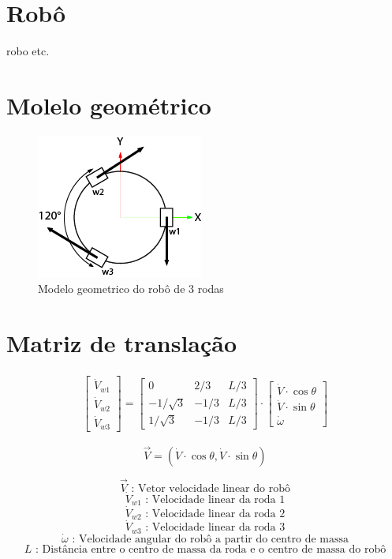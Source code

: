 
\section{Robô}
robo etc.

\section{Molelo geométrico}

\begin{figure}[h]
	\centering
	\includegraphics{figures/model}
	\caption{Modelo geometrico do robô de 3 rodas}
\end{figure}

\section{Matriz de translação}

\begin{gather}
	\begin{bmatrix} \dot{V}_{w1} \\  \dot{V}_{w2} \\  \dot{V}_{w3} \end{bmatrix}
	=
	\begin{bmatrix}
		0 & 2/3 & L/3 \\
		-1/\sqrt{3} & -1/3 & L/3\\
		1/\sqrt{3} & -1/3 & L/3
	\end{bmatrix}
	\cdot
	\begin{bmatrix} \dot{V}\cdot \cos{\theta} \\  \dot{V}\cdot \sin{\theta} \\  \dot{\omega} \end{bmatrix}
\end{gather}

\[ \overrightarrow{V} = (\dot{V}\cdot \cos{\theta} , \dot{V}\cdot \sin{\theta}) \]



\[\overrightarrow{V} \text{ :  Vetor velocidade linear do robô} \]  
\[\dot{V}_{w1}   \text{ :  Velocidade linear da roda 1} \]  
\[\dot{V}_{w2}   \text{ :  Velocidade linear da roda 2} \]  
\[\dot{V}_{w3}   \text{ :  Velocidade linear da roda 3} \] 
\[\dot{\omega}   \text{ :  Velocidade angular do robô a partir do centro de massa} \]  
\[L   \text{ :  Distância entre o centro de massa da roda e o centro de massa do robô} \]  




